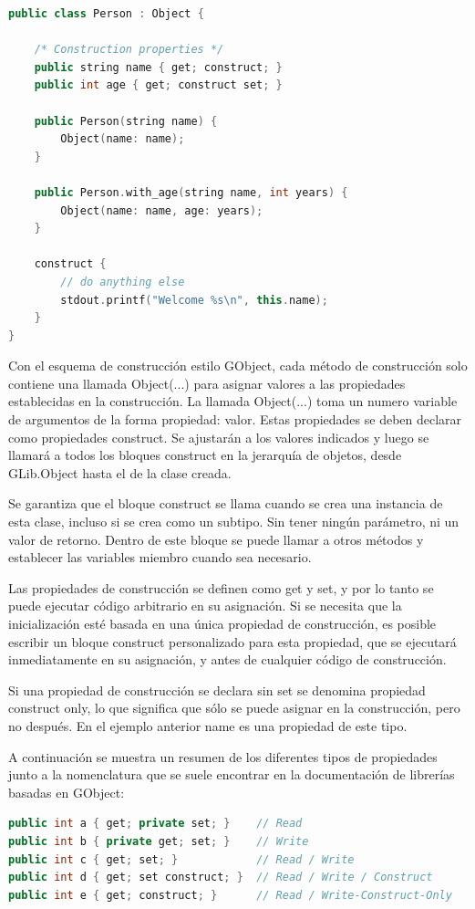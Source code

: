 \documentclass[12pt,twoside]{book}
\begin{document}
\begin{lstlisting}[language=C++]
public class Person : Object {
	
	/* Construction properties */
	public string name { get; construct; }
	public int age { get; construct set; }
	
	public Person(string name) {
		Object(name: name);
	}
	
	public Person.with_age(string name, int years) {
		Object(name: name, age: years);
	}
	
	construct {
		// do anything else
		stdout.printf("Welcome %s\n", this.name);
	}
}
\end{lstlisting}

Con el esquema de construcción estilo GObject, cada método de construcción solo contiene una llamada Object(...) para asignar valores a las propiedades establecidas en la construcción. La llamada Object(...) toma un numero variable de argumentos de la forma propiedad: valor. Estas propiedades se deben declarar como propiedades construct. Se ajustarán a los valores indicados y luego se llamará a todos los bloques construct {} en la jerarquía de objetos, desde GLib.Object hasta el de la clase creada.

Se garantiza que el bloque construct se llama cuando se crea una instancia de esta clase, incluso si se crea como un subtipo. Sin tener ningún parámetro, ni un valor de retorno. Dentro de este bloque se puede llamar a otros métodos y establecer las variables miembro cuando sea necesario.

Las propiedades de construcción se definen como get y set, y por lo tanto se puede ejecutar código arbitrario en su asignación. Si se necesita que la inicialización esté basada en una única propiedad de construcción, es posible escribir un bloque construct personalizado para esta propiedad, que se ejecutará inmediatamente en su asignación, y antes de cualquier código de construcción.

Si una propiedad de construcción se declara sin set se denomina propiedad construct only, lo que significa que sólo se puede asignar en la construcción, pero no después. En el ejemplo anterior name es una propiedad de este tipo.

A continuación se muestra un resumen de los diferentes tipos de propiedades junto a la nomenclatura que se suele encontrar en la documentación de librerías basadas en GObject:

\begin{lstlisting}[language=C++]
public int a { get; private set; }    // Read
public int b { private get; set; }    // Write
public int c { get; set; }            // Read / Write
public int d { get; set construct; }  // Read / Write / Construct
public int e { get; construct; }      // Read / Write-Construct-Only
\end{lstlisting}
\end{document}
